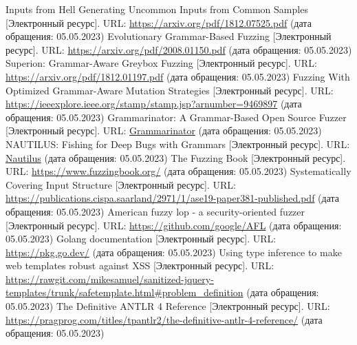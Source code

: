 \documentclass[a4paper]{article}
\begin{document}
\newpage

\begin{thebibliography}{}
      Inputs from Hell Generating Uncommon Inputs from Common Samples [Электронный ресурс]. URL: \href{https://arxiv.org/pdf/1812.07525.pdf}{https://arxiv.org/pdf/1812.07525.pdf} (дата обращения: 05.05.2023)
      Evolutionary Grammar-Based Fuzzing [Электронный ресурс]. URL: \href{https://arxiv.org/pdf/2008.01150.pdf}{https://arxiv.org/pdf/2008.01150.pdf} (дата обращения: 05.05.2023)
      Superion: Grammar-Aware Greybox Fuzzing [Электронный ресурс]. URL: \href{https://arxiv.org/pdf/1812.01197.pdf}{https://arxiv.org/pdf/1812.01197.pdf} (дата обращения: 05.05.2023)
      Fuzzing With Optimized Grammar-Aware
    Mutation Strategies [Электронный ресурс]. URL: \href{https://ieeexplore.ieee.org/stamp/stamp.jsp?arnumber=9469897}{https://ieeexplore.ieee.org/stamp/stamp.jsp?arnumber=9469897} (дата обращения: 05.05.2023)
      Grammarinator:
    A Grammar-Based Open Source Fuzzer [Электронный ресурс]. 
    URL: \href{https://www.researchgate.net/publication/328510752\_Grammarinator\_a\_grammar-based\_open\_source\_fuzzer}{Grammarinator}
    (дата обращения: 05.05.2023)
      NAUTILUS:
    Fishing for Deep Bugs with Grammars [Электронный ресурс]. URL: \href{https://www.ndss-symposium.org/wp-content/uploads/2019/02/ndss2019\_04A-3\_Aschermann\_paper.pdf}{Nautilus} (дата обращения: 05.05.2023)
      The Fuzzing Book [Электронный ресурс]. URL: \href{https://www.fuzzingbook.org/}{https://www.fuzzingbook.org/} (дата обращения: 05.05.2023)
      Systematically Covering Input Structure [Электронный ресурс]. URL: \href{https://publications.cispa.saarland/2971/1/ase19-paper381-published.pdf}{https://publications.cispa.saarland/2971/1/ase19-paper381-published.pdf} (дата обращения: 05.05.2023)
      American fuzzy lop - a security-oriented fuzzer [Электронный ресурс]. URL: \href{https://github.com/google/AFL}{https://github.com/google/AFL} (дата обращения: 05.05.2023)
     Golang documentation [Электронный ресурс]. URL: \href{https://pkg.go.dev/}{https://pkg.go.dev/} (дата обращения: 05.05.2023)
     Using type inference to make web templates robust against XSS [Электронный ресурс]. URL: \href{https://rawgit.com/mikesamuel/sanitized-jquery-templates/trunk/safetemplate.html\#problem\_definition}{https://rawgit.com/mikesamuel/sanitized-jquery-templates/trunk/safetemplate.html\#problem\_definition} (дата обращения: 05.05.2023)
     The Definitive ANTLR 4 Reference [Электронный ресурс]. URL: \href{https://pragprog.com/titles/tpantlr2/the-definitive-antlr-4-reference/}{https://pragprog.com/titles/tpantlr2/the-definitive-antlr-4-reference/} (дата обращения: 05.05.2023)
\end{thebibliography}
\end{document}
